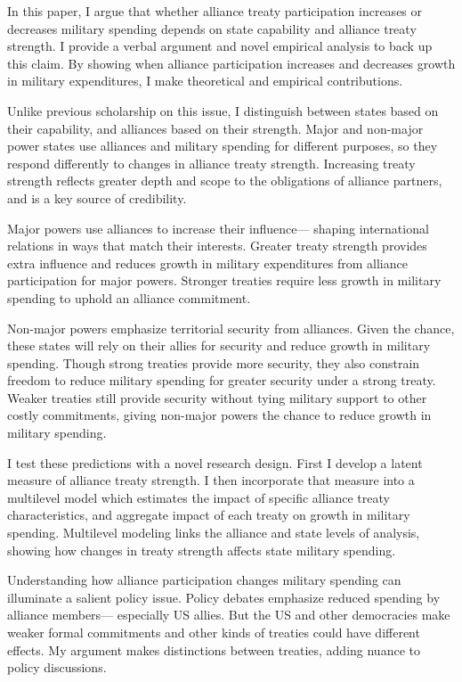 \documentclass[12pt]{article}
\begin{document}
In this paper, I argue that whether alliance treaty participation increases or decreases military spending depends on state capability and alliance treaty strength.  
I provide a verbal argument and novel empirical analysis to back up this claim.
By showing when alliance participation increases and decreases growth in military expenditures, I make theoretical and empirical contributions. 


Unlike previous scholarship on this issue, I distinguish between states based on their capability, and alliances based on their strength.  
Major and non-major power states use alliances and military spending for different purposes, so they respond differently to changes in alliance treaty strength.
Increasing treaty strength reflects greater depth and scope to the obligations of alliance partners, and is a key source of credibility. 


Major powers use alliances to increase their influence--- shaping international relations in ways that match their interests. 
Greater treaty strength provides extra influence and reduces growth in military expenditures from alliance participation for major powers. 
Stronger treaties require less growth in military spending to uphold an alliance commitment. 


Non-major powers emphasize territorial security from alliances.
Given the chance, these states will rely on their allies for security and reduce growth in military spending.   
Though strong treaties provide more security, they also constrain freedom to reduce military spending for greater security under a strong treaty. 
Weaker treaties still provide security without tying military support to other costly commitments, giving non-major powers the chance to reduce growth in military spending. 


I test these predictions with a novel research design.
First I develop a latent measure of alliance treaty strength. 
I then incorporate that measure into a multilevel model which estimates the impact of specific alliance treaty characteristics, and aggregate impact of each treaty on growth in military spending.
Multilevel modeling links the alliance and state levels of analysis, showing how changes in treaty strength affects state military spending. 


Understanding how alliance participation changes military spending can illuminate a salient policy issue.
Policy debates emphasize reduced spending by alliance members--- especially US allies. 
But the US and other democracies make weaker formal commitments and other kinds of treaties could have different effects. 
My argument makes distinctions between treaties, adding nuance to policy discussions. 
\end{document}

